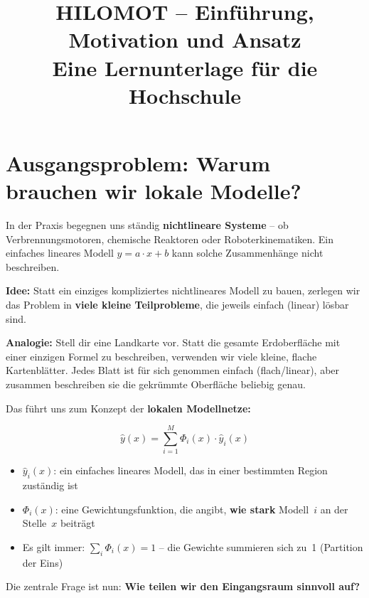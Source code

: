 \documentclass[12pt,a4paper]{article}
\title{\textbf{HILOMOT -- Einführung, Motivation und Ansatz}\\\large Eine Lernunterlage für die Hochschule}
\author{}
\date{}
\begin{document}
\maketitle
\tableofcontents
\newpage

\section{Ausgangsproblem: Warum brauchen wir lokale Modelle?}

In der Praxis begegnen uns ständig \textbf{nichtlineare Systeme} -- ob Verbrennungsmotoren, chemische Reaktoren oder Roboterkinematiken. Ein einfaches lineares Modell $y = a \cdot x + b$ kann solche Zusammenhänge nicht beschreiben.

\textbf{Idee:} Statt ein einziges kompliziertes nichtlineares Modell zu bauen, zerlegen wir das Problem in \textbf{viele kleine Teilprobleme}, die jeweils einfach (linear) lösbar sind.

\begin{mdframed}
\textbf{Analogie:} Stell dir eine Landkarte vor. Statt die gesamte Erdoberfläche mit einer einzigen Formel zu beschreiben, verwenden wir viele kleine, flache Kartenblätter. Jedes Blatt ist für sich genommen einfach (flach/linear), aber zusammen beschreiben sie die gekrümmte Oberfläche beliebig genau.
\end{mdframed}

Das führt uns zum Konzept der \textbf{lokalen Modellnetze:}

\begin{equation}
\hat{y}(x) = \sum_{i=1}^{M} \Phi_i(x) \cdot \hat{y}_i(x)
\end{equation}

\begin{itemize}
  \item $\hat{y}_i(x)$: ein einfaches lineares Modell, das in einer bestimmten Region \glqq zuständig\grqq{} ist
  \item $\Phi_i(x)$: eine Gewichtungsfunktion, die angibt, \textbf{wie stark} Modell~$i$ an der Stelle~$x$ beiträgt
  \item Es gilt immer: $\sum_i \Phi_i(x) = 1$ -- die Gewichte summieren sich zu~1 (Partition der Eins)
\end{itemize}

Die zentrale Frage ist nun: \textbf{Wie teilen wir den Eingangsraum sinnvoll auf?}

\end{document}

